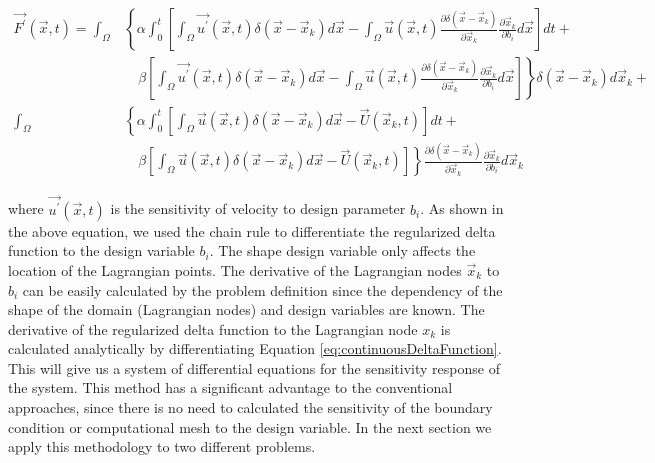 \documentclass{aiaa-pretty}
\begin{document}
%
\begin{equation}
\begin{aligned}\label{eq:forceingFunctionDerivative}
	\vec{F^\prime}(\vec{x}, t) = 
	\int_\Omega 
	&\left\{
 	\alpha \int_0^t
	\left[
	\int_\Omega \vec{u^\prime} (\vec{x}, t) \delta(\vec{x} - \vec{x}_k) d\vec{x} - 
	\int_\Omega \vec{u} (\vec{x}, t) \frac{\partial \delta(\vec{x} - \vec{x}_k)}{\partial \vec{x}_k} \frac{\partial \vec{x}_k}{\partial b_i} d\vec{x}
	\right]dt + \right. \\
	&\left.
	\quad \beta
	\left[
	\int_\Omega \vec{u^\prime} (\vec{x}, t) \delta(\vec{x} - \vec{x}_k) d\vec{x} - 
	\int_\Omega \vec{u} (\vec{x}, t) \frac{\partial \delta(\vec{x} - \vec{x}_k)}{\partial \vec{x}_k} \frac{\partial \vec{x}_k}{\partial b_i} d\vec{x}
	\right]
	\right\} \delta(\vec{x} - \vec{x}_k) d\vec{x}_k + \\
	\int_\Omega 
	&\left\{
 	\alpha \int_0^t
	\left[
	\int_\Omega \vec{u} (\vec{x}, t) \delta(\vec{x} - \vec{x}_k) d\vec{x} - \vec{U}\left( \vec{x}_k, t \right)
	\right]dt + \right. \\
	&\left.
	\quad \beta \left[
	\int_\Omega \vec{u} (\vec{x}, t) \delta(\vec{x} - \vec{x}_k) d\vec{x} - \vec{U}\left( \vec{x}_k, t \right)
	\right]
	\right\} \frac{\partial \delta(\vec{x} - \vec{x}_k)}{\partial \vec{x}_k} \frac{\partial \vec{x}_k}{\partial b_i} d\vec{x}_k
\end{aligned}
\end{equation}
%

where $\vec{u^\prime}\left( \vec{x}, t \right)$ is the sensitivity of velocity to design parameter $b_i$. As shown in the above equation, we used the chain rule to differentiate the regularized delta function to the design variable $b_i$. The shape design variable only affects the location of the Lagrangian points. The derivative of the Lagrangian nodes $\vec{x}_k$ to $b_i$ can be easily calculated by the problem definition since the dependency of the shape of the domain (Lagrangian nodes) and design variables are known. The derivative of the regularized delta function to the Lagrangian node $x_k$ is calculated analytically by differentiating Equation \eqref{eq:continuousDeltaFunction}. This will give us a system of differential equations for the sensitivity response of the system. This method has a significant advantage to the conventional approaches, since there is no need to calculated the sensitivity of the boundary condition or computational mesh to the design variable. In the next section we apply this methodology to two different problems.
\end{document}
